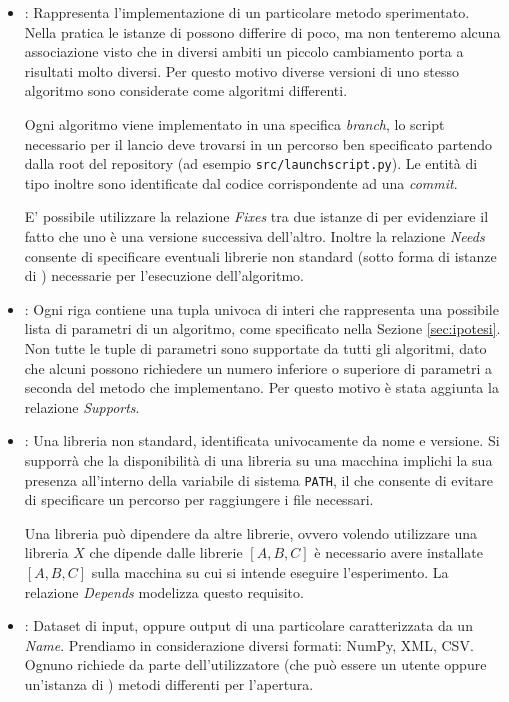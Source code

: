 \documentclass{article}
\begin{document}
\begin{itemize}
    \item {}: Rappresenta l'implementazione di un particolare metodo sperimentato. Nella pratica le istanze di  possono differire di poco, ma non tenteremo alcuna associazione visto che in diversi ambiti un piccolo cambiamento porta a risultati molto diversi. Per questo motivo diverse versioni di uno stesso algoritmo sono considerate come algoritmi differenti.

    Ogni algoritmo viene implementato in una specifica \emph{branch}, lo script necessario per il lancio deve trovarsi in un percorso ben specificato partendo dalla root del repository (ad esempio \texttt{src/launchscript.py}). Le entità di tipo  inoltre sono identificate dal codice corrispondente ad una \emph{commit}.

    E' possibile utilizzare la relazione \emph{Fixes} tra due istanze di  per evidenziare il fatto che uno è una versione successiva dell'altro. Inoltre la relazione \emph{Needs} consente di specificare eventuali librerie non standard (sotto forma di istanze di ) necessarie per l'esecuzione dell'algoritmo.
    \item {}: Ogni riga contiene una tupla univoca di interi che rappresenta una possibile lista di parametri di un algoritmo, come specificato nella Sezione \ref{sec:ipotesi}. Non tutte le tuple di parametri sono supportate da tutti gli algoritmi, dato che alcuni possono richiedere un numero inferiore o superiore di parametri a seconda del metodo che implementano. Per questo motivo è stata aggiunta la relazione \emph{Supports}.
    \item {}: Una libreria non standard, identificata univocamente da nome e versione. Si supporrà che la disponibilità di una libreria su una macchina implichi la sua presenza all'interno della variabile di sistema \texttt{PATH}, il che consente di evitare di specificare un percorso per raggiungere i file necessari.

    Una libreria può dipendere da altre librerie, ovvero volendo utilizzare una libreria $X$ che dipende dalle librerie $[A,B,C]$ è necessario avere installate $[A,B,C]$ sulla macchina su cui si intende eseguire l'esperimento. La relazione \emph{Depends} modelizza questo requisito.
    \item {}: Dataset di input, oppure output di una particolare  caratterizzata da un \emph{Name}. Prendiamo in considerazione diversi formati: NumPy, XML, CSV. Ognuno richiede da parte dell'utilizzatore (che può essere un utente oppure un'istanza di ) metodi differenti per l'apertura.


\end{itemize}
\end{document}
